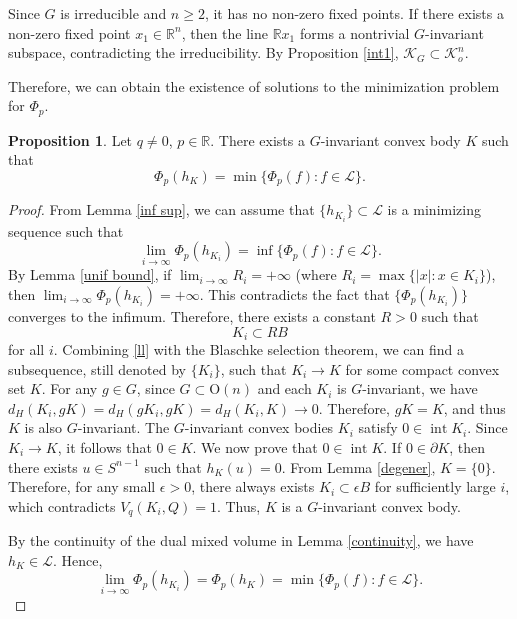 \documentclass[12pt, reqno]{amsart}
\newtheorem{lemma}[theorem]{Lemma}
\theoremstyle{definition}
\newtheorem{proposition}[theorem]{Proposition}
\theoremstyle{remark}
\numberwithin{equation}{section}
\newcommand{\R}{\mathbb{R}}
\newcommand{\On}{\mathrm{O}(n)}
\begin{document}

Since $G$ is irreducible and $n\ge 2$, it has no non-zero fixed points.  If there exists a non-zero fixed point $x_1 \in \mathbb{R}^n$, then the line $\mathbb{R}x_1$ forms a nontrivial $G$-invariant subspace, contradicting the irreducibility.  By Proposition \ref{int1}, $\mathcal{K}_{G}\subset \mathcal{K}^{n}_{o}$.


Therefore, we can obtain the existence of solutions to the minimization problem for $\Phi_{p}$.

\begin{proposition}\label{min exsitence}
Let $q\neq0$, $p\in\R$.	There exists a $G$-invariant convex body  $K$  such that 
	\begin{equation}\label{minget}
			\Phi_{p}(h_{K})=\min \{\Phi_{p}(f): f\in \mathcal{L}\}.
	\end{equation}
\end{proposition}

\begin{proof}
	From Lemma \ref{inf sup}, we can assume that $\{h_{K_{i}}\}\subset\mathcal{L}$ is a minimizing sequence such that 
	$$\lim_{i \to \infty}\Phi_{p}(h_{K_{i}})=\inf \{\Phi_{p}(f): f\in \mathcal{L}\}.$$
	By Lemma \ref{unif bound}, if  $\lim_{i \to \infty} R_{i} = +\infty$ (where  $R_{i}=\max\{|x|: x\in K_{i}\}$), then
	$\lim_{i \to \infty} \Phi_{p}(h_{K_{i}}) = +\infty.$ This contradicts the  fact that $\{\Phi_{p}(h_{K_{i}})\}$ converges to the infimum.  Therefore, there exists a constant $R>0$ such that
	\begin{equation} \label{ll}
	K_{i}\subset RB
	\end{equation}
	for all $i$.  Combining \eqref{ll} with the   Blaschke selection theorem, we can find a subsequence, still denoted by $\{K_{i}\}$, such that $K_{i}\rightarrow K$ for some compact convex set $K$. For any $g\in G$, since $G \subset \On$ and  each $K_{i}$ is $G$-invariant, we have $d_{H}(K_{i}, gK)=d_{H}(gK_{i}, gK)=d_{H}(K_{i}, K)\rightarrow 0$. Therefore, $gK = K$, and thus $K$ is also $G$-invariant.  The $G$-invariant convex bodies $K_i$ satisfy $0 \in \operatorname{int} K_i$. Since $K_i \to K$, it follows that $0 \in K$. We now prove that $0 \in \operatorname{int} K$. If $0 \in \partial K$, then there exists $u \in S^{n-1}$ such that $h_K(u) = 0$. From Lemma \ref{degener}, $K = \{0\}$. Therefore, for any small $\epsilon > 0$, there always exists $K_i \subset \epsilon B$ for sufficiently large $i$, which contradicts $V_q(K_i, Q) = 1$. Thus, $K$ is a  $G$-invariant convex body.
	
	 By the continuity of the dual mixed volume in Lemma \ref{continuity}, we have $h_{K}\in\mathcal{L}$. Hence, $$\lim_{i \to \infty}\Phi_{p}(h_{K_{i}})=\Phi_{p}(h_{K})=\min \{\Phi_{p}(f): f\in \mathcal{L}\}.$$ 
\end{proof}
\end{document}
